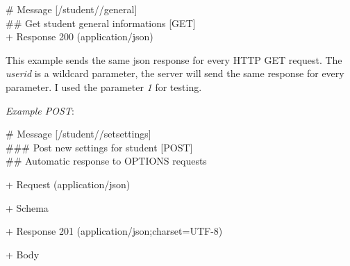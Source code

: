 \begin{addmargin}[1em]{1em}
	\# Message {[}/student//general{]}\\
	\#\# Get student general informations [GET]\\
	$+$ Response 200 (application/json)
	\begin{addmargin}[1em]{1em}
	\end{addmargin}
\end{addmargin}

This example sends the same json response for every HTTP GET request. The \emph{userid} is a wildcard parameter, the server will send the same response for every parameter. I used the parameter \emph{1} for testing.


\emph{Example POST}:

\begin{addmargin}[1em]{1em}
	\# Message {[}/student//setsettings{]}\\
	\#\#\# Post new settings for student {[}POST{]}\\
	\#\# Automatic response to OPTIONS requests
	
	+ Request (application/json)
	\begin{addmargin}[1em]{1em}
		+ Schema
		\begin{addmargin}[1em]{1em}
		\end{addmargin}
	\end{addmargin}
	
	+ Response 201 (application/json;charset=UTF-8)
	\begin{addmargin}[1em]{1em}
		+ Body
		\begin{addmargin}[1em]{1em}
		\end{addmargin}
	\end{addmargin}
\end{addmargin}

